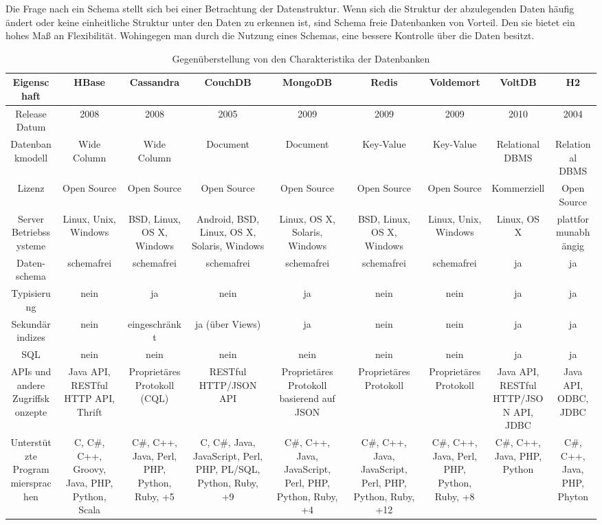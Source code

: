 Die Frage nach ein Schema stellt sich bei einer Betrachtung der Datenstruktur. Wenn sich die Struktur der abzulegenden Daten häufig ändert oder keine einheitliche Struktur unter den Daten zu erkennen ist, sind Schema freie Datenbanken von Vorteil. Den sie bietet ein hohes Maß an Flexibilität. Wohingegen man durch die Nutzung eines Schemas, eine bessere Kontrolle über die Daten besitzt.  


\begin{table}[H]
\tiny
\caption{Gegenüberstellung von den Charakteristika der Datenbanken}
\label{tb_charakteristika}
\setlength{\tabcolsep}{1mm}
\begin{tabulary} {\linewidth} {C | C | C | C | C | C | C | C | C}
\toprule
Eigenschaft & HBase & Cassandra & CouchDB & MongoDB & Redis & Voldemort & VoltDB & H2 \\  
\midrule
Release Datum & 2008 & 2008 & 2005 & 2009 & 2009 & 2009 & 2010 & 2004 \\
\midrule
Datenbankmodell & Wide Column & Wide Column & Document & Document & Key-Value & Key-Value& Relational DBMS & Relational DBMS \\
\midrule
Lizenz & Open Source & Open Source & Open Source & Open Source & Open Source & Open Source & Kommerziell & Open Source \\
\midrule
Server Betriebssysteme & Linux, Unix, Windows & BSD, Linux, OS X, Windows & Android, BSD, Linux, OS X, Solaris, Windows & Linux, OS X, Solaris, Windows & BSD, Linux, OS X, Windows & Linux, Unix, Windows & Linux, OS X & plattformunabhängig \\
\midrule
Daten-schema & schemafrei & schemafrei & schemafrei & schemafrei & schemafrei & schemafrei & ja & ja \\
\midrule
Typisierung & nein & ja & nein & ja & nein & nein & ja & ja \\
\midrule
Sekundärindizes & nein & eingeschränkt & ja (über Views) & ja & nein & nein & ja & ja \\
\midrule
SQL & nein & nein & nein & nein & nein & nein & ja & ja \\
\midrule
APIs und andere Zugriffskonzepte & Java API, RESTful HTTP API, Thrift & Proprietäres Protokoll (CQL) & RESTful HTTP/JSON API & Proprietäres Protokoll basierend auf JSON & Proprietäres Protokoll & Proprietäres Protokoll & Java API, RESTful HTTP/JSON API, JDBC & Java API, ODBC, JDBC \\
\midrule
Unterstützte Programmiersprachen & C, C\#, C++, Groovy, Java, PHP, Python, Scala & C\#, C++, Java, Perl, PHP, Python, Ruby, +5 & C, C\#, Java, JavaScript, Perl, PHP, PL/SQL, Python, Ruby, +9 & C\#, C++, Java, JavaScript, Perl, PHP, Python, Ruby, +4 & C\#, C++, Java, JavaScript, Perl, PHP, Python, Ruby, +12 & C\#, C++, Java, Perl, PHP, Python, Ruby, +8 & C\#, C++, Java, PHP, Python & C\#, C++, Java, PHP, Phyton \\

\end{tabulary}
\end{table}
